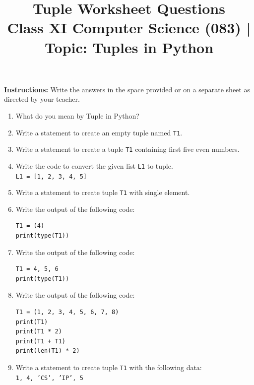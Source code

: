 \documentclass[11pt,a4paper]{article}
\title{\textbf{Tuple Worksheet Questions}\\[0.3em]
\large Class XI Computer Science (083) | Topic: Tuples in Python}
\author{}
\date{}
\begin{document}
\maketitle
\thispagestyle{fancy}

\begin{center}
\textbf{Instructions:} Write the answers in the space provided or on a separate sheet as directed by your teacher.
\end{center}

\vspace{0.5em}

\begin{enumerate}[label=\textbf{Q\arabic*.}]

\item What do you mean by Tuple in Python?

\item Write a statement to create an empty tuple named \texttt{T1}.

\item Write a statement to create a tuple \texttt{T1} containing first five even numbers.

\item Write the code to convert the given list \texttt{L1} to tuple.\\
\texttt{L1 = [1, 2, 3, 4, 5]}

\item Write a statement to create tuple \texttt{T1} with single element.

\item Write the output of the following code:
\begin{lstlisting}
T1 = (4)
print(type(T1))
\end{lstlisting}

\item Write the output of the following code:
\begin{lstlisting}
T1 = 4, 5, 6
print(type(T1))
\end{lstlisting}

\item Write the output of the following code:
\begin{lstlisting}
T1 = (1, 2, 3, 4, 5, 6, 7, 8)
print(T1)
print(T1 * 2)
print(T1 + T1)
print(len(T1) * 2)
\end{lstlisting}

\item Write a statement to create tuple \texttt{T1} with the following data:\\
\texttt{1, 4, 'CS', 'IP', 5}


\end{enumerate}
\end{document}
